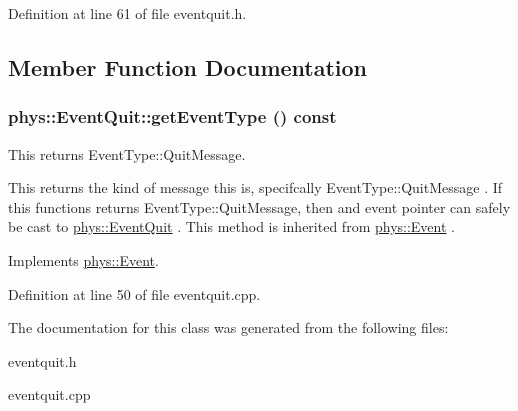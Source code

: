 Definition at line 61 of file eventquit.h.



\subsection{Member Function Documentation}
\hypertarget{classphys_1_1EventQuit_a4df44098d0ef838db55a8e2a016d0724}{
\subsubsection[{getEventType}]{ phys::EventQuit::getEventType () const}}
\label{dd/dea/classphys_1_1EventQuit_a4df44098d0ef838db55a8e2a016d0724}


This returns EventType::QuitMessage. 

This returns the kind of message this is, specifcally EventType::QuitMessage . If this functions returns EventType::QuitMessage, then and event pointer can safely be cast to \hyperlink{classphys_1_1EventQuit}{phys::EventQuit} . This method is inherited from \hyperlink{classphys_1_1Event}{phys::Event} . 

Implements \hyperlink{classphys_1_1Event_ac2c0623a6bc399e62f4b9fb2c022ea73}{phys::Event}.



Definition at line 50 of file eventquit.cpp.



The documentation for this class was generated from the following files:\begin{DoxyCompactItemize}
\item 
eventquit.h\item 
eventquit.cpp\end{DoxyCompactItemize}
